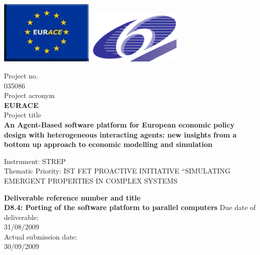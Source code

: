 \documentclass[a4paper,11pt]{article}
\begin{document}
\thispagestyle{empty}

\vspace{\baselineskip}
\includegraphics[width=45mm]{EURACE-logo.png}		
\hfill
\includegraphics[width=45mm]{FW6-logo.png}

\begin{center}
Project no.\\
035086\\
Project acronym\\
{\bf EURACE}\\
Project title\\
{\bf An Agent-Based software platform for European economic policy design with heterogeneous interacting agents: new insights from a bottom up approach to economic modelling and simulation}\\
\end{center}

\vspace*{\baselineskip}\noindent
Instrument: STREP\\[\baselineskip]
Thematic Priority: IST FET PROACTIVE INITIATIVE ``SIMULATING EMERGENT PROPERTIES IN COMPLEX SYSTEMS\\

\vspace*{2\baselineskip}
\begin{center}
{\bf
Deliverable reference number and title\\
D8.4: Porting of the software platform to parallel computers
}
Due date of deliverable:\\
31/08/2009\\
Actual submission date:\\
30/09/2009\\
\end{center}
\end{document}
